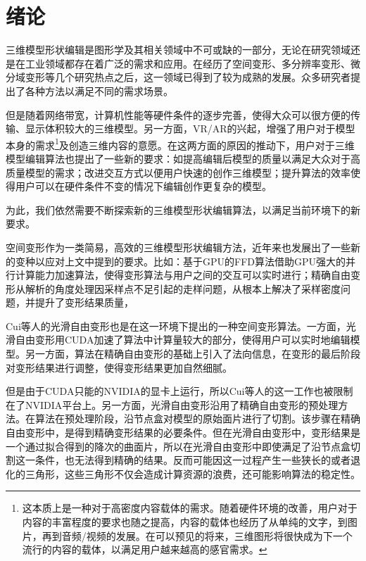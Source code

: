 
\chapter{绪论}

    三维模型形状编辑是图形学及其相关领域中不可或缺的一部分，无论在研究领域还是在工业领域都存在着广泛的需求和应用。在经历了空间变形、多分辨率变形、微分域变形等几个研究热点之后，这一领域已得到了较为成熟的发展。众多研究者提出了各种方法以满足不同的需求场景。

    但是随着网络带宽，计算机性能等硬件条件的逐步完善，使得大众可以很方便的传输、显示体积较大的三维模型。另一方面，VR/AR的兴起，增强了用户对于模型本身的需求\footnote{这本质上是一种对于高密度内容载体的需求。随着硬件环境的改善，用户对于内容的丰富程度的要求也随之提高，内容的载体也经历了从单纯的文字，到图片，再到音频/视频的发展。在可以预见的将来，三维图形将很快成为下一个流行的内容的载体，以满足用户越来越高的感官需求。}及创造三维内容的意愿。在这两方面的原因的推动下，用户对于三维模型编辑算法也提出了一些新的要求：如提高编辑后模型的质量以满足大众对于高质量模型的需求；改进交互方式以便用户快速的创作三维模型；提升算法的效率使得用户可以在硬件条件不变的情况下编辑创作更复杂的模型。

    为此，我们依然需要不断探索新的三维模型形状编辑算法，以满足当前环境下的新要求。

    空间变形作为一类简易，高效的三维模型形状编辑方法，近年来也发展出了一些新的变种以应对上文中提到的要求。比如：基于GPU的FFD算法\cite{chua2000, modat2010}借助GPU强大的并行计算能力加速算法，使得变形算法与用户之间的交互可以实时进行；精确自由变形\cite{Feng98, Feng00}从解析的角度处理因采样点不足引起的走样问题，从根本上解决了采样密度问题，并提升了变形结果质量，

    Cui等人的光滑自由变形\cite{Cui15}也是在这一环境下提出的一种空间变形算法。一方面，光滑自由变形用CUDA加速了算法中计算量较大的部分，使得用户可以实时地编辑模型。另一方面，算法在精确自由变形\cite{Feng98}的基础上引入了法向信息，在变形的最后阶段对变形结果进行调整，使得变形结果更加自然细腻。

    但是由于CUDA只能的NVIDIA的显卡上运行，所以Cui等人的这一工作也被限制在了NVIDIA平台上。另一方面，光滑自由变形沿用了精确自由变形\cite{Feng98, Feng00}的预处理方法。在算法在预处理阶段，沿节点盒对模型的原始面片进行了切割。该步骤在精确自由变形中，是得到精确变形结果的必要条件。但在光滑自由变形中，变形结果是一个通过拟合得到的降次的曲面片，所以在光滑自由变形中即使满足了沿节点盒切割这一条件，也无法得到精确的结果。反而可能因这一过程产生一些狭长的或者退化的三角形，这些三角形不仅会造成计算资源的浪费，还可能影响算法的稳定性。

